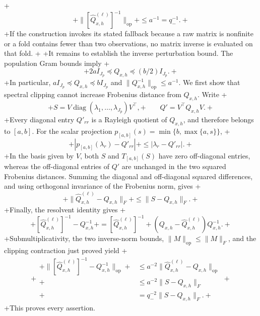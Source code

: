 +\[
+\bigl\lVert[\widehat Q^{(\ell)}_{x,h}]^{-1}\bigr\rVert_{\mathrm{op}}
+\le a^{-1}=q_-^{-1}.
+\]
+If the construction invokes its stated fallback because a raw matrix is nonfinite or a fold contains fewer than two observations, no matrix inverse is evaluated on that fold.
+
+It remains to establish the inverse perturbation bound. The population Gram bounds imply
+\[
+2aI_{J_p}\preceq Q_{x,h}\preceq (b/2)I_{J_p}.
+\]
+In particular, \(aI_{J_p}\preceq Q_{x,h}\preceq bI_{J_p}\) and \(\lVert Q_{x,h}^{-1}\rVert_{\mathrm{op}}\le a^{-1}\). We first show that spectral clipping cannot increase Frobenius distance from \(Q_{x,h}\). Write
+\[
+S=V\operatorname{diag}(\lambda_1,\ldots,\lambda_{J_p})V^\top,
+\qquad Q'=V^\top Q_{x,h}V.
+\]
+Every diagonal entry \(Q'_{rr}\) is a Rayleigh quotient of \(Q_{x,h}\), and therefore belongs to \([a,b]\). For the scalar projection \(p_{[a,b]}(s)=\min\{b,\max\{a,s\}\}\),
+\[
+|p_{[a,b]}(\lambda_r)-Q'_{rr}|
+\le |\lambda_r-Q'_{rr}|.
+\]
+In the basis given by \(V\), both \(S\) and \(T_{[a,b]}(S)\) have zero off-diagonal entries, whereas the off-diagonal entries of \(Q'\) are unchanged in the two squared Frobenius distances. Summing the diagonal and off-diagonal squared differences, and using orthogonal invariance of the Frobenius norm, gives
+\[
+\lVert\widehat Q^{(\ell)}_{x,h}-Q_{x,h}\rVert_F
+\le \lVert S-Q_{x,h}\rVert_F.
+\]
+Finally, the resolvent identity gives
+\[
+[\widehat Q^{(\ell)}_{x,h}]^{-1}-Q_{x,h}^{-1}
+=[\widehat Q^{(\ell)}_{x,h}]^{-1}
+(Q_{x,h}-\widehat Q^{(\ell)}_{x,h})Q_{x,h}^{-1}.
+\]
+Submultiplicativity, the two inverse-norm bounds, \(\lVert M\rVert_{\mathrm{op}}\le\lVert M\rVert_F\), and the clipping contraction just proved yield
+\[
+\begin{aligned}
+\bigl\lVert[\widehat Q^{(\ell)}_{x,h}]^{-1}-Q_{x,h}^{-1}\bigr\rVert_{\mathrm{op}}
+&\le a^{-2}\lVert\widehat Q^{(\ell)}_{x,h}-Q_{x,h}\rVert_{\mathrm{op}}\\
+&\le a^{-2}\lVert S-Q_{x,h}\rVert_F\\
+&=q_-^{-2}\lVert S-Q_{x,h}\rVert_F.
+\end{aligned}
+\]
+This proves every assertion.